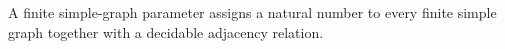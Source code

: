 A finite simple-graph parameter assigns a natural number to every finite
simple graph together with a decidable adjacency relation.
